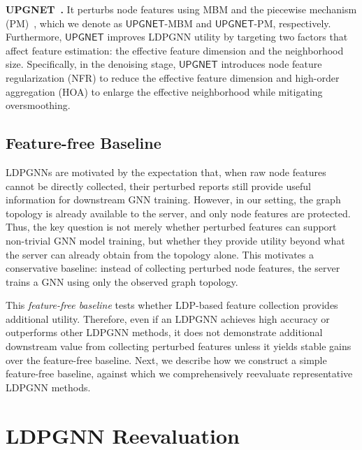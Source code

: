 \documentclass[conference,compsoc]{IEEEtran}
\theoremstyle{boldplain}
\theoremstyle{bolddefinition}
\theoremstyle{remark}
\newcommand{\mypara}[1]{\noindent\textbf{#1.}\xspace}
\newcommand{\hoa}{HOA\xspace}
\newcommand{\ldpgnn}{LDPGNN\xspace}
\newcommand{\ldpgnns}{LDPGNNs\xspace}
\newcommand{\upgnet}{\ensuremath{\mathsf{UPGNET}}\xspace}
\newcommand{\mbmm}{MBM\xspace}
\newcommand{\pmm}{PM\xspace}
\newcommand{\nfr}{NFR\xspace}
\begin{document}
\vspace{0.1cm}
\mypara{UPGNET~\cite{upgnet-cite}} 
It perturbs node features using \mbmm and the piecewise mechanism (\pmm)~\cite{wang2019ldpmultidim,pei2024lgapgnn}, which we denote as \upgnet-\mbmm and \upgnet-\pmm, respectively. 
Furthermore, \upgnet improves \ldpgnn utility by targeting two factors that affect feature estimation: the effective feature dimension and the neighborhood size. 
Specifically, in the denoising stage, \upgnet introduces node feature regularization (\nfr) to reduce the effective feature dimension and high-order aggregation (\hoa) to enlarge the effective neighborhood while mitigating oversmoothing. 













\subsection{Feature-free Baseline}
\label{subsec:missing_alternative}




\ldpgnns are motivated by the expectation that, when raw node features cannot be directly collected, their perturbed reports still provide useful information for downstream GNN training.
However, in our setting, the graph topology is already available to the server, and only node features are protected.
Thus, the key question is not merely whether perturbed features can support non-trivial GNN model training, but whether they provide utility beyond what the server can already obtain from the topology alone.
This motivates a conservative baseline: instead of collecting perturbed node features, the server trains a GNN using only the observed graph topology.

This \textit{feature-free baseline} tests whether LDP-based feature collection provides additional utility.
Therefore, even if an \ldpgnn achieves high accuracy or outperforms other \ldpgnn methods, it does not demonstrate additional downstream value from collecting perturbed features unless it yields stable gains over the feature-free baseline.
Next, we describe how we construct a simple feature-free baseline, against which we comprehensively reevaluate representative \ldpgnn methods.




\section{LDPGNN Reevaluation}
\label{sec:zero_feature}
\end{document}
